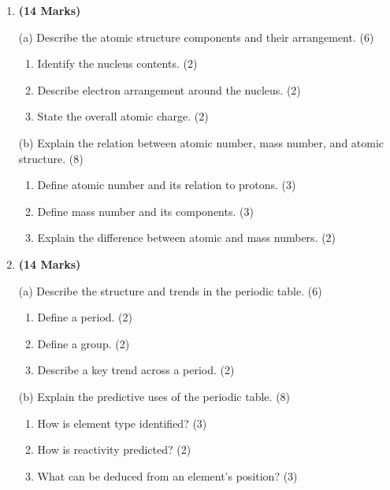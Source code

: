 \documentclass[12pt]{article}
\newenvironment{questionblock}[1][10]{
    \par\Needspace{#1\baselineskip}
}{
    \par
}
\begin{document}
\begin{enumerate}[start=3]
  \begin{questionblock}[15]
    \item \textbf{(14 Marks)}

    (a) Describe the atomic structure components and their arrangement. (6)
    \begin{enumerate}[label=(\roman*)]
      \item Identify the nucleus contents. (2)
      \item Describe electron arrangement around the nucleus. (2)
      \item State the overall atomic charge. (2)
    \end{enumerate}

    (b) Explain the relation between atomic number, mass number, and atomic structure. (8)
    \begin{enumerate}[label=(\roman*)]
      \item Define atomic number and its relation to protons. (3)
      \item Define mass number and its components. (3)
      \item Explain the difference between atomic and mass numbers. (2)
    \end{enumerate}
  \end{questionblock}

  \begin{questionblock}[15]
    \item \textbf{(14 Marks)}

    (a) Describe the structure and trends in the periodic table. (6)
    \begin{enumerate}[label=(\roman*)]
      \item Define a period. (2)
      \item Define a group. (2)
      \item Describe a key trend across a period. (2)
    \end{enumerate}

    (b) Explain the predictive uses of the periodic table. (8)
    \begin{enumerate}[label=(\roman*)]
      \item How is element type identified? (3)
      \item How is reactivity predicted? (2)
      \item What can be deduced from an element's position? (3)
    \end{enumerate}
  \end{questionblock}


\end{enumerate}
\end{document}
